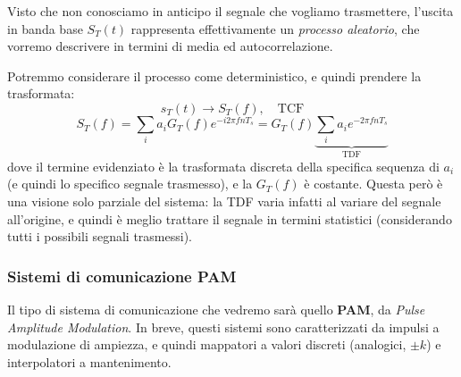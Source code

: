 \documentclass[a4paper,11pt]{article}
\begin{document}
Visto che non conosciamo in anticipo il segnale che vogliamo trasmettere, l'uscita in banda base $S_T(t)$ rappresenta effettivamente un \textit{processo aleatorio}, che vorremo descrivere in termini di media ed autocorrelazione. 

Potremmo considerare il processo come deterministico, e quindi prendere la trasformata:
$$
s_T(t) \rightarrow S_T(f), \quad \text{TCF}
$$
$$
S_T(f) = \sum_i a_i G_T (f) e^{-i 2 \pi f n T_s} = G_T(f) \underbrace{\sum_i a_i e^{- 2 \pi f n T_s}}_\text{TDF}
$$
dove il termine evidenziato è la trasformata discreta della specifica sequenza di $a_i$ (e quindi lo specifico segnale trasmesso), e la $G_T(f)$ è costante. Questa però è una visione solo parziale del sistema: la TDF varia infatti al variare del segnale all'origine, e quindi è meglio trattare il segnale in termini statistici (considerando tutti i possibili segnali trasmessi). 

\subsubsection{Sistemi di comunicazione PAM}
Il tipo di sistema di comunicazione che vedremo sarà quello \textbf{PAM}, da \textit{Pulse Amplitude Modulation}. In breve, questi sistemi sono caratterizzati da impulsi a modulazione di ampiezza, e quindi mappatori a valori discreti (analogici, $\pm k$) e interpolatori a mantenimento.
\end{document}
